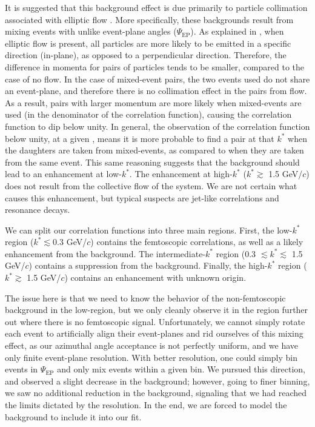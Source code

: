 \documentclass[/home/jesse/Analysis/FemtoAnalysis/AnalysisNotes/AnalysisNoteJBuxton.tex]{subfiles}
\begin{document}
It is suggested that this background effect is due primarily to particle collimation associated with elliptic flow \cite{Kisiel:2017}.  
More specifically, these backgrounds result from mixing events with unlike event-plane angles ($\Psi_{\textrm{EP}}$).  
As explained in \cite{Kisiel:2017}, when elliptic flow is present, all particles are more likely to be emitted in a specific direction (in-plane), as opposed to a perpendicular direction.  
Therefore, the difference in momenta for pairs of particles tends to be smaller, compared to the case of no flow.  
In the case of mixed-event pairs, the two events used do not share an event-plane, and therefore there is no collimation effect in the pairs from flow.  
As a result, pairs with larger momentum are more likely when mixed-events are used (in the denominator of the correlation function), causing the correlation function to dip below unity.  
In general, the observation of the correlation function below unity, at a given \kstar, means it is more probable to find a pair at that $k^{*}$ when the daughters are taken from mixed-events, as compared to when they are taken from the same event.
This same reasoning suggests that the background should lead to an enhancement at low-$k^{*}$.  
The enhancement at high-$k^{*}$ ($k^{*} \gtrsim$ 1.5 GeV/$c$) does not result from the collective flow of the system.  
We are not certain what causes this enhancement, but typical suspects are jet-like correlations and resonance decays.

We can split our correlation functions into three main regions.  
First, the low-$k^{*}$ region ($k^{*} \lesssim 0.3$ GeV/$c$) contains the femtoscopic correlations, as well as a likely enhancement from the background.  
The intermediate-$k^{*}$ region (0.3 $\lesssim k^{*} \lesssim$ 1.5 GeV/$c$) contains a suppression from the background.  
Finally, the high-$k^{*}$ region ($k^{*} \gtrsim$ 1.5 GeV/$c$) contains an enhancement with unknown origin.

The issue here is that we need to know the behavior of the non-femtoscopic background in the low-\kstar region, but we only cleanly observe it in the region further out where there is no femtoscopic signal.
Unfortunately, we cannot simply rotate each event to artificially align their event-planes and rid ourselves of this mixing effect, as our azimuthal angle acceptance is not perfectly uniform, and we have only finite event-plane resolution.
With better resolution, one could simply bin events in $\Psi_{\mathrm{EP}}$ and only mix events within a given bin.
We pursued this direction, and observed a slight decrease in the background; however, going to finer binning, we saw no additional reduction in the background, signaling that we had reached the limits dictated by the resolution.
In the end, we are forced to model the background to include it into our fit.
\end{document}
